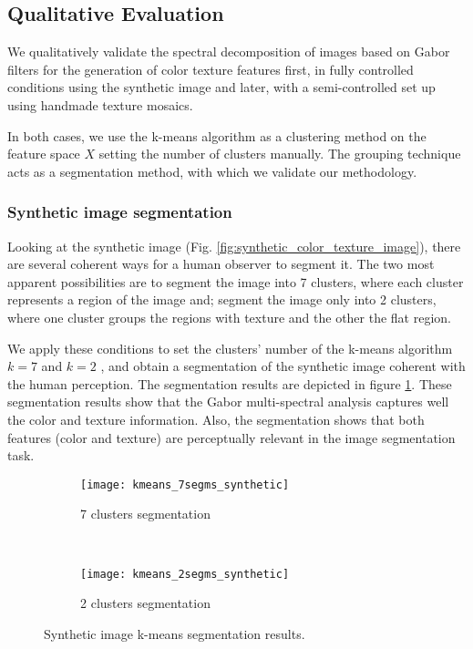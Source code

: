 \subsection{Qualitative Evaluation}
We qualitatively validate the spectral decomposition of images based on Gabor filters for the generation of color texture features first, in fully controlled conditions using the synthetic image and later, with a semi-controlled set up using handmade texture mosaics.

In both cases, we use the k-means algorithm as a clustering method on the feature space $X$ setting the number of clusters manually. The grouping technique acts as a segmentation method, with which we validate our methodology.

\subsubsection{Synthetic image segmentation}
Looking at the synthetic image (Fig. \ref{fig:synthetic_color_texture_image}),  there are several coherent ways for a human observer to segment it. The two most apparent possibilities are to segment the image into 7 clusters, where each cluster represents a region of the image and; segment the image only into 2 clusters, where one cluster groups the regions with texture and the other the flat region. 

We apply these conditions to set the clusters' number of the k-means algorithm $k = 7$ and $k = 2$ ,  and obtain a segmentation of the synthetic image coherent with the human perception. The segmentation results are depicted in figure  \ref{fig:kmeans_segms_synthetic_img}. These segmentation results show that the Gabor multi-spectral analysis captures well the color and texture information. Also, the segmentation shows that both features (color and texture) are perceptually relevant in the image segmentation task.  

\begin{figure}[!ht]
    \centering
    \begin{subfigure}[b]{\textwidth}
        \texttt{[image: kmeans\_7segms\_synthetic]}
        \caption{7 clusters segmentation}
    \end{subfigure} \\    
    \begin{subfigure}[b]{\textwidth}
    	\texttt{[image: kmeans\_2segms\_synthetic]}
        \caption{2 clusters segmentation}
    \end{subfigure} 
        	    
    \caption{Synthetic image k-means segmentation results.}\label{fig:kmeans_segms_synthetic_img}    
\end{figure}

